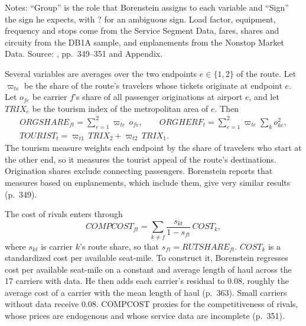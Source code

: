 \begin{table}[htbp]
\smallskip
\begin{minipage}{\linewidth}
\footnotesize Notes: ``Group'' is the role that Borenstein assigns to each variable and ``Sign'' the sign he
expects, with ? for an ambiguous sign. Load factor, equipment, frequency and stops come from the Service
Segment Data, fares, shares and circuity from the DB1A sample, and enplanements from the Nonstop Market Data.
Source: \citet{Borenstein1989}, pp.~349--351 and Appendix.
\end{minipage}
\end{table}

 Several variables are averages over the two endpoints $e \in \{1,2\}$ of the
route. Let $\varpi_{te}$ be the share of the route's travelers whose tickets originate at endpoint $e$. Let
$o_{fe}$ be carrier $f$'s share of all passenger originations at airport $e$, and let $\mathit{TRIX}_e$ be the
tourism index of the metropolitan area of $e$. Then
\begin{equation}\label{eq:09-bor-org}
\begin{gathered}
\mathit{ORGSHARE}_{ft} = \sum_{e=1}^{2} \varpi_{te}\, o_{fe}, \qquad
\mathit{ORGHERF}_t = \sum_{e=1}^{2} \varpi_{te} \sum_{k} o_{ke}^2, \\
\mathit{TOURIST}_t = \varpi_{t1}\, \mathit{TRIX}_2 + \varpi_{t2}\, \mathit{TRIX}_1 .
\end{gathered}
\end{equation}
The tourism measure weights each endpoint by the share of travelers who start at the other end, so it measures
the tourist appeal of the route's destinations. Origination shares exclude connecting passengers. Borenstein
reports that measures based on enplanements, which include them, give very similar results (p.~349).

The cost of rivals enters through
\begin{equation}\label{eq:09-bor-compcost}
\mathit{COMPCOST}_{ft} = \sum_{k \neq f} \frac{s_{kt}}{1 - s_{ft}}\, \mathit{COST}_k ,
\end{equation}
where $s_{kt}$ is carrier $k$'s route share, so that $s_{ft} = \mathit{RUTSHARE}_{ft}$. $\mathit{COST}_k$ is a
standardized cost per available seat-mile. To construct it, Borenstein regresses cost per available seat-mile on
a constant and average length of haul across the 17 carriers with data. He then adds each carrier's residual to
0.08, roughly the average cost of a carrier with the mean length of haul (p.~363). Small carriers without data
receive 0.08. COMPCOST proxies for the competitiveness of rivals, whose prices are endogenous and whose service
data are incomplete (p.~351).

